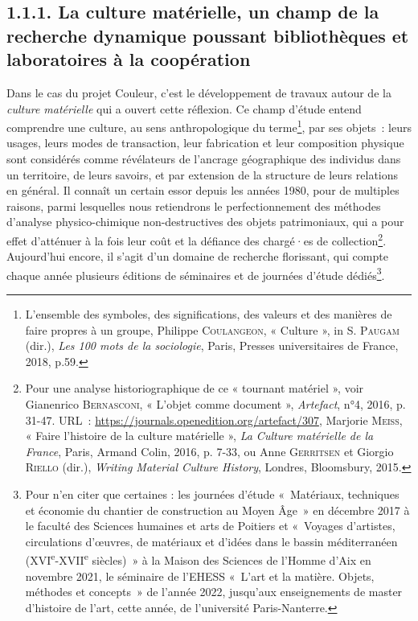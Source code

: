 \documentclass[a4paper,12pt, twoside]{book}
\begin{document}
\subsection*{1.1.1. La culture matérielle, un champ de la recherche dynamique poussant bibliothèques et laboratoires à la coopération}

Dans le cas du projet Couleur, c’est le développement de travaux autour de la \textit{culture matérielle} qui a ouvert cette réflexion. Ce champ d’étude entend comprendre une culture, au sens anthropologique du terme\footnote{L’ensemble des symboles, des significations, des valeurs et des manières de faire propres à un groupe, Philippe \textsc{Coulangeon}, « Culture », in S. \textsc{Paugam} (dir.), \textit{Les 100 mots de la sociologie}, Paris, Presses universitaires de France, 2018, p.59.}, par ses objets~: leurs usages, leurs modes de transaction, leur fabrication et leur composition physique sont considérés comme révélateurs de l’ancrage géographique des individus dans un territoire, de leurs savoirs, et par extension de la structure de leurs relations en général. Il connaît un certain essor depuis les années 1980, pour de multiples raisons, parmi lesquelles nous retiendrons le perfectionnement des méthodes d’analyse physico-chimique non-destructives des objets patrimoniaux, qui a pour effet d’atténuer à la fois leur coût et la défiance des chargé·es de collection\footnote{Pour une analyse historiographique de ce « tournant matériel », voir Gianenrico \textsc{Bernasconi}, « L’objet comme document », \textit{Artefact}, n°4, 2016, p. 31-47. URL~: \url{https://journals.openedition.org/artefact/307}, Marjorie \textsc{Meiss}, « Faire l’histoire de la culture matérielle », \textit{La Culture matérielle de la France}, Paris, Armand Colin, 2016, p. 7-33, ou Anne \textsc{Gerritsen} et Giorgio \textsc{Riello} (dir.), \textit{Writing Material Culture History}, Londres, Bloomsbury, 2015.}. Aujourd’hui encore, il s’agit d’un domaine de recherche florissant, qui compte chaque année plusieurs éditions de séminaires et de journées d’étude dédiés\footnote{Pour n’en citer que certaines : les journées d’étude «~Matériaux, techniques et économie du chantier de construction au Moyen Âge~» en décembre 2017 à le faculté des Sciences humaines et arts de Poitiers et «~Voyages d’artistes, circulations d’œuvres, de matériaux et d’idées dans le bassin méditerranéen (XVI\textsuperscript{e}-XVII\textsuperscript{e} siècles)~» à la Maison des Sciences de l’Homme d’Aix en novembre 2021, le séminaire de l’EHESS «~L’art et la matière. Objets, méthodes et concepts~» de l’année 2022, jusqu’aux enseignements de master d’histoire de l’art, cette année, de l’université Paris-Nanterre.}.
\end{document}
